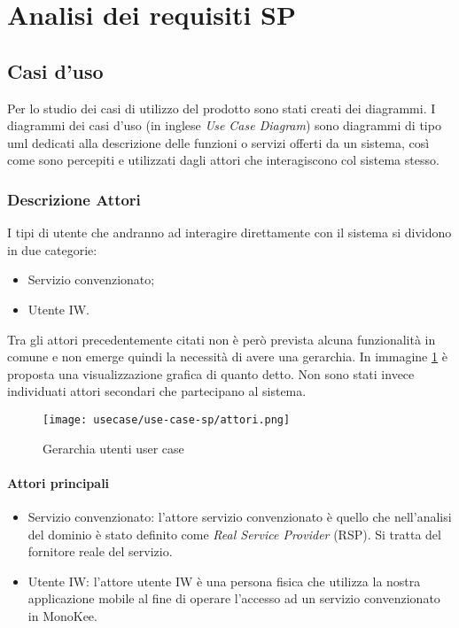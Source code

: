 \section{Analisi dei requisiti SP}
\subsection{Casi d'uso}

Per lo studio dei casi di utilizzo del prodotto sono stati creati dei diagrammi.
I diagrammi dei casi d'uso (in inglese \emph{Use Case Diagram}) sono diagrammi di tipo \gls{uml} dedicati alla descrizione delle funzioni o servizi offerti da un sistema, così come sono percepiti e utilizzati dagli attori che interagiscono col sistema stesso.

\subsubsection{Descrizione Attori}
I tipi di utente che andranno ad interagire direttamente con il sistema si dividono in due categorie: 
\begin{itemize}
    \item Servizio convenzionato;
    \item Utente IW.
\end{itemize}
Tra gli attori precedentemente citati non è però prevista alcuna funzionalità in comune e non emerge quindi la necessità di avere una gerarchia. In immagine \ref{fig:ger-actors-sp} è proposta una visualizzazione grafica di quanto detto.
Non sono stati invece individuati attori secondari che partecipano al sistema.
\begin{figure}[!htbp]    
    \centering
    \texttt{[image: usecase/use-case-sp/attori.png]} 
    \caption{Gerarchia utenti user case}
    \label{fig:ger-actors-sp} 
\end{figure}
\paragraph{Attori principali}
\begin{itemize}
    \item Servizio convenzionato: l’attore servizio convenzionato è quello che nell’analisi del dominio è stato definito come \textit{Real Service Provider} (RSP). Si tratta del fornitore reale del servizio.
    \item Utente IW: l’attore utente IW è una persona fisica che utilizza la nostra applicazione mobile al fine di operare l’accesso ad un servizio convenzionato in MonoKee.
\end{itemize}

